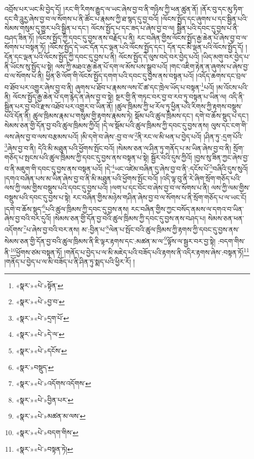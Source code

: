 འབྲོས་པར་ཡང་མི་བྱེད་དོ། །རང་གི་རིགས་རྒྱུད་ལ་ཡང་ཞེས་བྱ་བ་ནི་གཉིས་ཀྱི་ཕན་ཚུན་ནོ། །ནོར་བུ་དང་མུ་ཏིག་དང་བཻ་ཌཱུརྱ་ཞེས་བྱ་བ་ལ་སོགས་པ་ནི་ཚོང་པ་རྣམས་ཀྱི་ཐ་སྙད་དུ་བྱ་བའོ། །ལོངས་སྤྱོད་དང་ཞུགས་པ་དང་སྦྱིན་པའི་སེམས་གསུམ་དུ་གྱུར་པའི་སྦྱིན་པ་དང་། ལོངས་སྤྱོད་པ་དང་ཟད་པ་ཞེས་བྱ་བ་ལ། སྦྱིན་པའི་དབང་དུ་བྱས་པ་ནི་བཤད་ཟིན་ཏོ། །ལོངས་སྤྱོད་ཀྱི་དབང་དུ་བྱས་ནས་བརྗོད་པ་ནི། རང་བཞིན་གྱིས་ལོངས་སྤྱོད་རྒྱ་ཆེན་པོ་ཞེས་བྱ་བ་ལ་སོགས་པ་བསྟན་ཏོ། །ལོངས་སྤྱོད་དེ་ཡང་དོན་དང་ལྡན་པའི་ལོངས་སྤྱོད་དང་། དོན་དང་མི་ལྡན་པའི་ལོངས་སྤྱོད་དོ། །དོན་དང་ལྡན་པའི་ལོངས་སྤྱོད་ཀྱི་དབང་དུ་བྱས་པ་ནི། ལོངས་སྤྱོད་དེ་ལུས་བདེ་བར་བྱེད་པའོ། །ཡིད་མགུ་བར་བྱེད་པ་ནི་ཡོངས་སུ་སྤྱོད་པ་སྟེ། ལས་ཀྱི་མཐའ་རྒྱ་ཆེན་པོ་དག་ལ་མོས་པས་སྒྲུབ་པའོ། །གང་འཇིག་རྟེན་ན་ཞུགས་པ་ཞེས་བྱ་བ་ལ་སོགས་པ་ནི། ཕྱིན་ཅི་ལོག་གི་ལོངས་སྤྱོད་དགག་པའི་དབང་དུ་བྱས་ནས་བསྟན་པའོ། །འདོད་ཆགས་དང་བྲལ་བ་ཐོབ་པར་འགྱུར་ཞེས་བྱ་བ་ནི། ཞུགས་པ་ཐོབ་པ་རྣམས་ལས་ངོ་ཚ་དང་ཁྲེལ་ཡོད་པ་བསྟན་\footnote{«སྣར་»«པེ་»སྟོན་}པའོ། །མ་འོངས་པའི་ནི། ལོངས་སྤྱོད་རྒྱ་ཆེན་པོ་དག་རྙེད་ན་ཞེས་བྱ་བ་སྟེ། སྔར་གྱི་ནི་གཏང་བར་བྱ་བ་རབ་ཏུ་བསྟན་པ་ཡིན་ལ། འདི་ནི་སྦྱིན་པར་བྱ་བའི་རྫས་འཐོབ་པར་འགྱུར་བ་ཡིན་ནོ། །ཚུལ་ཁྲིམས་ཀྱི་ཕ་རོལ་ཏུ་ཕྱིན་པའི་རིགས་ཀྱི་རྟགས་བསྡུས་པའི་དོན་ནི། ཚུལ་ཁྲིམས་རྣམ་པ་གསུམ་གྱི་རྟགས་རྣམས་ཏེ། སྡོམ་པའི་ཚུལ་ཁྲིམས་དང་། དགེ་བ་ཆོས་སྡུད་པ་དང་། སེམས་ཅན་གྱི་དོན་བྱ་བའི་ཚུལ་ཁྲིམས་ཀྱིའོ། །དེ་ལ་སྡོམ་པའི་ཚུལ་ཁྲིམས་ཀྱི་དབང་དུ་བྱས་ནས། ལུས་དང་ངག་གི་ལས་ཞེས་བྱ་བ་ལས་བརྩམས་པའོ། །མི་དགེ་བ་ཞེས་:བྱ་བ་ལ་\footnote{«སྣར་»«པེ་»བྱ་བ་}ནི་རང་ལ་མི་ཕན་པ་བྱེད་པའོ། །ཤིན་ཏུ་:དྲག་པོའི་\footnote{«སྣར་»«པེ་»དྲག་པོ་}ཞེས་བྱ་བ་ནི། དེའི་མི་མཐུན་པའི་ཕྱོགས་སྤོང་བའོ། །སེམས་ཅན་ལ་ཤིན་ཏུ་གནོད་པ་མ་ཡིན་ཞེས་བྱ་བ་ནི། སྲོག་གཅོད་པ་སྤངས་པའི་ཚུལ་ཁྲིམས་ཀྱི་དབང་དུ་བྱས་ནས་བསྟན་པ་སྟེ། སྦྱོར་བའི་དུས་ཀྱིའོ། །བྱས་སུ་ཟིན་ཀྱང་ཞེས་བྱ་བ་ནི་མཇུག་གི་དབང་དུ་བྱས་ནས་བསྟན་པའོ། །དེ་\footnote{«སྣར་»«པེ་»དེ་ལ་}ཡང་འཛེམ་བཞིན་དུ་ཞེས་བྱ་བ་ནི་:དངོས་པོ་\footnote{«སྣར་»«པེ་»དངོས་}བཞིའི་དུས་སུའོ། །དགའ་བཞིན་པས་མ་ཡིན་ཞེས་བྱ་བ་ནི་མི་མཐུན་པའི་ཕྱོགས་སྤོང་བའོ། །འདི་ལྟ་བུ་ནི་རེ་ཞིག་སྲོག་གཅོད་པའི་ལས་ཀྱི་ལམ་གྱིས་བསྡུས་པའི་དབང་དུ་བྱས་པའོ། །ལག་པ་དང་བོང་བ་ཞེས་བྱ་བ་ལ་སོགས་པ་ནི། ལས་ཀྱི་ལམ་གྱིས་བསྡུས་པའི་དབང་དུ་བྱས་པ་སྟེ། རང་བཞིན་གྱིས་མཉེས་གཤིན་ཞེས་བྱ་བ་ལ་སོགས་པ་ནི་སྲོག་གཅོད་པ་ལ་ཡང་ངོ། །དགེ་བ་ཆོས་སྡུད་\footnote{«སྣར་»བསྡུད་}པའི་ཚུལ་ཁྲིམས་ཀྱི་དབང་དུ་བྱས་ནས། རང་བཞིན་གྱིས་ཀྱང་བསོད་ནམས་ལ་དགའ་བ་ཡིན་ཞེས་བྱ་བའི་བར་དུའོ། །སེམས་ཅན་གྱི་དོན་བྱ་བའི་ཚུལ་ཁྲིམས་ཀྱི་དབང་དུ་བྱས་ནས་བཤད་པ། སེམས་ཅན་ཕན་འདོགས་\footnote{«སྣར་»«པེ་»འདོགས་འདོགས་}པ་ཞེས་བྱ་བའི་བར་ནས། མ་:བྱིན་པ་\footnote{«སྣར་»«པེ་»བྱིན་པར་}ལེན་པ་སྤོང་བའི་ཚུལ་ཁྲིམས་ཀྱི་རྟགས་ཀྱི་དབང་དུ་བྱས་ནས་སེམས་ཅན་གྱི་དོན་བྱ་བའི་ཚུལ་ཁྲིམས་ནི་ཇི་ལྟར་རྟགས་དང་:མཚན་མ་ལ་\footnote{«སྣར་»«པེ་»མཚན་མ་ལས་}ལྟོས་ལ་སྦྱར་བར་བྱ་སྟེ། :བདག་གིས་ནི་\footnote{«སྣར་»«པེ་»བདག་གིས་}ཕྱོགས་ཙམ་བསྟན་ཏོ། །གནོད་པ་བྱེད་པ་ལ་མི་མཇེད་པའི་བཟོད་པའི་རྟགས་ནི་འདིར་རྟགས་ཞེས་:བསྟན་ཏོ།\footnote{«སྣར་»«པེ་»བསྟན་ཏེ།} །གནོད་པ་བྱེད་པ་ལ་མི་བཟོད་པ་ནི་ཤིན་ཏུ་སྨད་པའི་ཕྱིར་རོ། །

